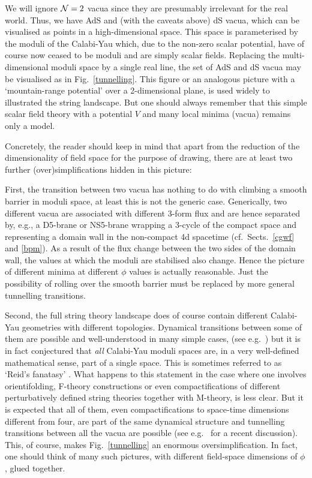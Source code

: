 \documentclass[12pt]{article}
\numberwithin{equation}{section}
\begin{document}
We will ignore ${\cal N}=2$ vacua since they are presumably irrelevant for the real world. Thus, we have AdS and (with the caveats above) dS vacua, which can be visualised as points in a high-dimensional space. This space is parameterised by the moduli of the Calabi-Yau which, due to the non-zero scalar potential, have of course now ceased to be moduli and are simply scalar fields. Replacing the multi-dimensional moduli space by a single real line, the set of AdS and dS vacua may be visualised as in Fig.~\ref{tunnelling}. This figure or an analogous picture with a `mountain-range potential' over a 2-dimensional plane, is used widely to illustrated the string landscape. But one should always remember that this simple scalar field theory with a potential $V$ and many local minima (vacua) remains only a model.

Concretely, the reader should keep in mind that apart from the reduction of the dimensionality of field space for the purpose of drawing, there are at least two further (over)simplifications hidden in this picture: 

First, the transition between two vacua has nothing to do with climbing a smooth barrier in moduli space, at least this is not the generic case. Generically, two different vacua are associated with different 3-form flux and are hence separated by, e.g., a D5-brane or NS5-brane wrapping a 3-cycle of the compact space and representing a domain wall in the non-compact 4d spacetime (cf.~Sects.~\ref{cgwf} and \ref{bpm}). As a result of the flux change between the two sides of the domain wall, the values at which the moduli are stabilised also change. Hence the picture of different minima at different $\phi$ values is actually reasonable. Just the possibility of rolling over the smooth barrier must be replaced by more general tunnelling transitions. 

Second, the full string theory landscape does of course contain different Calabi-Yau geometries with different topologies. Dynamical transitions between some of them are possible and well-understood in many simple cases, (see e.g.~\cite{Greene:1996cy}) but it is in fact conjectured that {\it all} Calabi-Yau moduli spaces are, in a very well-defined mathematical sense, part of a single space. This is sometimes referred to as `Reid's fanatasy' \cite{reid}. What happens to this statement in the case where one involves orientifolding, F-theory constructions or even compactifications of different perturbatively defined string theories together with M-theory, is less clear. But it is expected that all of them, even compactifications to space-time dimensions different from four, are part of the same dynamical structure and tunnelling transitions between all the vacua are possible
(see e.g.~\cite{Carifio:2017nyb} for a recent discussion). This, of course, makes Fig.~\ref{tunnelling} an enormous oversimplification. In fact, one should think of many such pictures, with different field-space dimensions of $\phi$, glued together.
\end{document}
